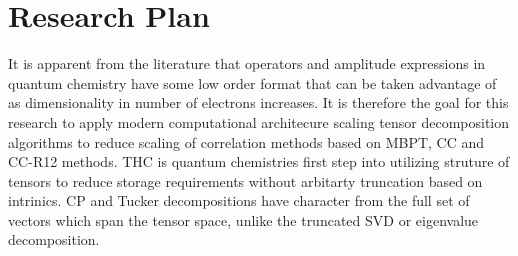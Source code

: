 \section{Research Plan}
	It is apparent from the literature that operators and amplitude expressions in quantum chemistry have some low order format that can be taken advantage of as dimensionality in number of electrons increases.  It is therefore the goal for this research to apply modern computational architecure scaling tensor decomposition algorithms to reduce scaling of correlation methods based on MBPT, CC and CC-R12 methods.  THC is quantum chemistries first step into utilizing struture of tensors to reduce storage requirements without arbitarty truncation based on intrinics.  CP and Tucker decompositions have character from the full set of vectors which span the tensor space, unlike the truncated SVD or eigenvalue decomposition.  